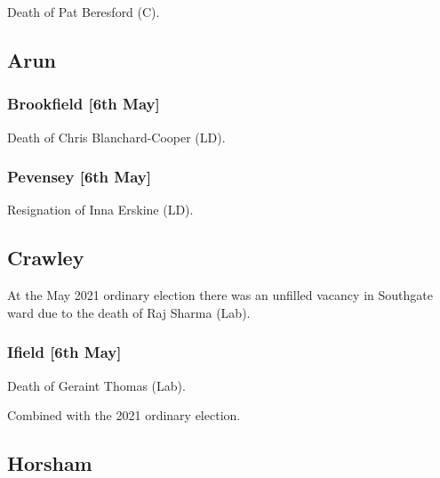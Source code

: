 \documentclass[a4paper,openany]{book}
\begin{document}
\begin{resultsiii}

Death of Pat Beresford (C).

\subsection*{Arun}

\subsubsection*{Brookfield \hspace*{\fill}\nolinebreak[1]%
	\enspace\hspace*{\fill}
	[6th May]}


Death of Chris Blanchard-Cooper (LD).

\subsubsection*{Pevensey \hspace*{\fill}\nolinebreak[1]%
	\enspace\hspace*{\fill}
	[6th May]}


Resignation of Inna Erskine (LD).

\subsection*{Crawley}

At the May 2021 ordinary election there was an unfilled vacancy in Southgate ward due to the death of Raj Sharma (Lab).

\subsubsection*{Ifield \hspace*{\fill}\nolinebreak[1]%
	\enspace\hspace*{\fill}
	[6th May]}


Death of Geraint Thomas (Lab).

Combined with the 2021 ordinary election.

\subsection*{Horsham}


\end{resultsiii}
\end{document}
